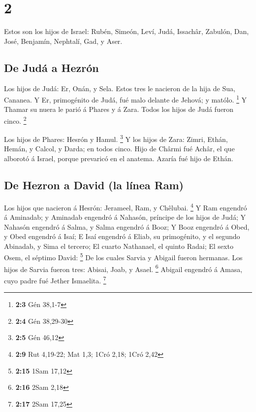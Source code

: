 \hypertarget{section-1}{%
\section{2}\label{section-1}}

 Estos son los hijos de Israel: Rubén, Simeón, Leví, Judá,
Issachâr, Zabulón,  Dan, José, Benjamín, Nephtalí, Gad, y
Aser.

\hypertarget{de-juduxe1-a-hezruxf3n}{%
\subsection{De Judá a Hezrón}\label{de-juduxe1-a-hezruxf3n}}

 Los hijos de Judá: Er, Onán, y Sela. Estos tres le nacieron
de la hija de Sua, Cananea. Y Er, primogénito de Judá, fué malo delante
de Jehová; y matólo. \footnote{\textbf{2:3} Gén 38,1-7}  Y
Thamar su nuera le parió á Phares y á Zara. Todos los hijos de Judá
fueron cinco. \footnote{\textbf{2:4} Gén 38,29-30}

 Los hijos de Phares: Hesrón y Hamul. \footnote{\textbf{2:5}
  Gén 46,12}  Y los hijos de Zara: Zimri, Ethán, Hemán, y
Calcol, y Darda; en todos cinco.  Hijo de Chârmi fué Achâr,
el que alborotó á Israel, porque prevaricó en el anatema. 
Azaría fué hijo de Ethán.

\hypertarget{de-hezron-a-david-la-luxednea-ram}{%
\subsection{De Hezron a David (la línea
Ram)}\label{de-hezron-a-david-la-luxednea-ram}}

 Los hijos que nacieron á Hesrón: Jerameel, Ram, y Chêlubai.
\footnote{\textbf{2:9} Rut 4,19-22; Mat 1,3; 1Cró 2,18; 1Cró 2,42}
 Y Ram engendró á Aminadab; y Aminadab engendró á Nahasón,
príncipe de los hijos de Judá;  Y Nahasón engendró á Salma,
y Salma engendró á Booz;  Y Booz engendró á Obed, y Obed
engendró á Isaí;  E Isaí engendró á Eliab, su primogénito,
y el segundo Abinadab, y Sima el tercero;  El cuarto
Nathanael, el quinto Radai;  El sexto Osem, el séptimo
David: \footnote{\textbf{2:15} 1Sam 17,12}  De los cuales
Sarvia y Abigail fueron hermanas. Los hijos de Sarvia fueron tres:
Abisai, Joab, y Asael. \footnote{\textbf{2:16} 2Sam 2,18} 
Abigail engendró á Amasa, cuyo padre fué Jether Ismaelita. \footnote{\textbf{2:17}
  2Sam 17,25}

